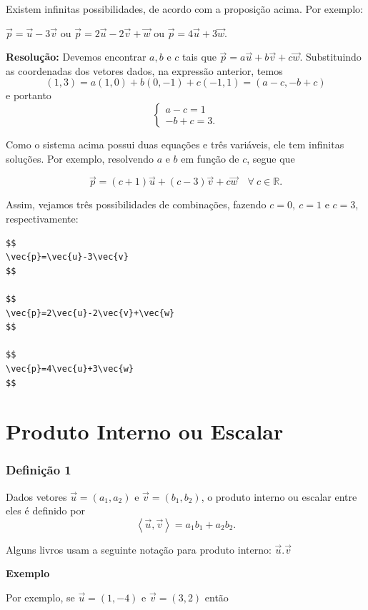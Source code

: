 \documentclass[
  brazilian,
  letterpaper,
  DIV=11,
  numbers=noendperiod]{scrreprt}
\theoremstyle{definition}
\theoremstyle{plain}
\theoremstyle{definition}
\theoremstyle{remark}
\begin{document}
Existem infinitas possibilidades, de acordo com a proposição acima. Por
exemplo:

\(\vec{p}=\vec{u}-3\vec{v}\) ou \(\vec{p}=2\vec{u}-2\vec{v}+\vec{w}\) ou
\(\vec{p}=4\vec{u}+3\vec{w}\).

\textbf{Resolução:} Devemos encontrar \(a,b\) e \(c\) tais que
\(\vec{p}=a\vec{u}+b\vec{v}+c\vec{w}.\) Substituindo as coordenadas dos
vetores dados, na expressão anterior, temos \[
    (1,3)=a(1,0)+b(0,-1)+c(-1,1)=(a-c,-b+c) 
\] e portanto \[
    \left\{ \begin{array}{l}  a-c=1\\ -b+c=3. \end{array} \right.
\]

Como o sistema acima possui duas equações e três variáveis, ele tem
infinitas soluções. Por exemplo, resolvendo \(a\) e \(b\) em função de
\(c\), segue que

\[
    \vec{p} = (c+1) \vec{u} + (c-3) \vec{v} +c\vec{w} \quad \forall \ c \in \mathbb{R}.
\]

Assim, vejamos três possibilidades de combinações, fazendo \(c=0,\ c=1\)
e \(c=3\), respectivamente:

\begin{verbatim}
$$
\vec{p}=\vec{u}-3\vec{v}
$$

$$
\vec{p}=2\vec{u}-2\vec{v}+\vec{w}
$$

$$
\vec{p}=4\vec{u}+3\vec{w}
$$
\end{verbatim}


\chapter{Produto Interno ou Escalar}\label{produto-interno-ou-escalar}

\subsection{Definição 1}\label{definiuxe7uxe3o-1-1}

Dados vetores \(\vec{u}=(a_1,a_2)\) e \(\vec{v}=(b_1,b_2)\), o produto
interno ou escalar entre eles é definido por \[
\left\langle\vec{u},\vec{v}\right\rangle=a_1b_1+a_2b_2.
\]

Alguns livros usam a seguinte notação para produto interno:
\(\vec{u}.\vec{v}\)

\textbf{Exemplo}

Por exemplo, se \(\vec{u}=(1,-4)\) e \(\vec{v}=(3,2)\) então ﻿﻿
\end{document}
